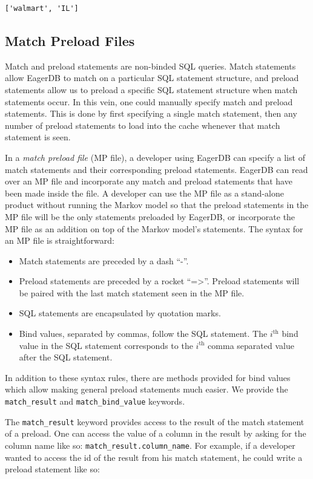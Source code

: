 \documentclass[12pt]{article}
\begin{document}
\begin{lstlisting}
['walmart', 'IL']
\end{lstlisting}

\subsection{Match Preload Files}

Match and preload statements are non-binded SQL queries. Match statements allow EagerDB to match on a particular SQL statement structure, and preload statements allow us to preload a specific SQL statement structure when match statements occur. In this vein, one could manually specify match and preload statements. This is done by first specifying a single match statement, then any number of preload statements to load into the cache whenever that match statement is seen.

In a \emph{match preload file} (MP file), a developer using EagerDB can specify a list of match statements and their corresponding preload statements. EagerDB can read over an MP file and incorporate any match and preload statements that have been made inside the file. A developer can use the MP file as a stand-alone product without running the Markov model so that the preload statements in the MP file will be the only statements preloaded by EagerDB, or incorporate the MP file as an addition on top of the Markov model's statements. The syntax for an MP file is straightforward:

\begin{itemize}
  \item Match statements are preceded by a dash ``-''.
  \item Preload statements are preceded by a rocket ``=\textgreater''. Preload statements will be paired with the last match statement seen in the MP file.
  \item SQL statements are encapsulated by quotation marks.
  \item Bind values, separated by commas, follow the SQL statement. The $i^{\textrm{th}}$ bind value in the SQL statement corresponds to the $i^{\textrm{th}}$ comma separated value after the SQL statement.
\end{itemize}

In addition to these syntax rules, there are methods provided for bind values which allow making general preload statements much easier. We provide the \texttt{match\_result} and \texttt{match\_bind\_value} keywords.

The \texttt{match\_result} keyword provides access to the result of the match statement of a preload. One can access the value of a column in the result by asking for the column name like so: \texttt{match\_result.column\_name}. For example, if a developer wanted to access the id of the result from his match statement, he could write a preload statement like so:
\end{document}
